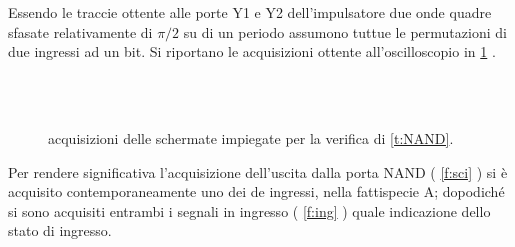 	Essendo le traccie ottente alle porte Y1 e Y2 dell'impulsatore due onde quadre 
	sfasate relativamente di $\pi/2$ su di un periodo assumono tuttue le permutazioni di due ingressi ad un bit.
	Si riportano le acquisizioni ottente all'oscilloscopio in \figurename{ \ref{f:osci}} .
	\begin{figure}[hb]
		\centering
		\\
	\\
	\caption{acquisizioni delle schermate impiegate per la verifica di \tablename{ \ref{t:NAND}}.}
	\label{f:osci}
\end{figure}

	Per rendere significativa l'acquisizione dell'uscita dalla porta NAND ( \figurename{ \ref{f:sci}} ) si è acquisito contemporaneamente uno dei de ingressi, nella fattispecie A; dopodiché si sono acquisiti entrambi i segnali  in ingresso (\figurename{ \ref{f:ing}} ) quale indicazione dello stato di ingresso.
	
